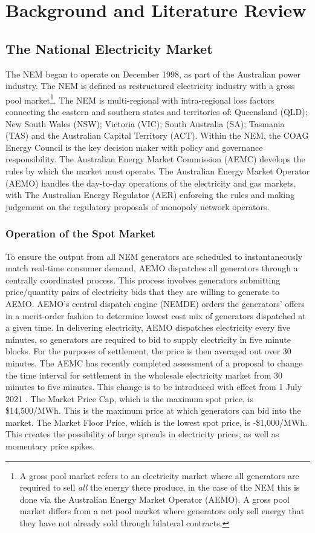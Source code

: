 \chapter{Background and Literature Review}
\section{ The National Electricity Market }
The NEM began to operate on December 1998, as part of the Australian power industry. The NEM is defined as restructured electricity industry with a gross pool market\footnote{A gross pool market refers to an electricity market where all generators are required to sell \textit{all} the energy there produce, in the case of the NEM this is done via the Australian Energy Market Operator (AEMO). A gross pool market differs from a net pool market where generators only sell energy that they have not already sold through bilateral contracts.}. The NEM is multi-regional with intra-regional loss factors connecting the eastern and southern states and territories of: Queensland (QLD); New South Wales (NSW); Victoria (VIC); South Australia (SA); Tasmania (TAS) and the Australian Capital Territory (ACT). Within the NEM, the COAG Energy Council is the key decision maker with policy and governance responsibility. The Australian Energy Market Commission (AEMC) develops the rules by which the market must operate. The Australian Energy Market Operator (AEMO) handles the day-to-day operations of the electricity and gas markets, with The Australian Energy Regulator (AER) enforcing the rules and making judgement on the regulatory proposals of monopoly network operators.\parencite{EnergyGov} 
\subsection{ Operation of the Spot Market }
To ensure the output from all NEM generators are scheduled to instantaneously match real-time consumer demand, AEMO dispatches all generators through a centrally coordinated process. This process involves generators submitting price/quantity pairs of electricity bids that they are willing to generate to AEMO. AEMO’s central dispatch engine (NEMDE) orders the generators’ offers in a merit-order fashion to determine lowest cost mix of generators dispatched at a given time. In delivering electricity, AEMO dispatches electricity every five minutes, so generators are required to bid to supply electricity in five minute blocks. For the purposes of settlement, the price is then averaged out over 30 minutes. The AEMC has recently completed assessment of a proposal to change the time interval for settlement in the wholesale electricity market from 30 minutes to five minutes. This change is to be introduced with effect from 1 July 2021 \parencite{5minSettle}. The Market Price Cap, which is the maximum spot price, is \$14,500/MWh. This is the maximum price at which generators can bid into the market. The Market Floor Price, which is the lowest spot price, is -\$1,000/MWh. This creates the possibility of large spreads in electricity prices, as well as momentary price spikes.
